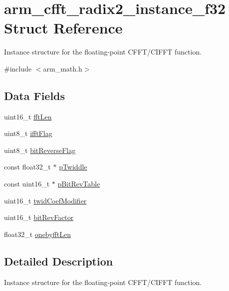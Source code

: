 \hypertarget{structarm__cfft__radix2__instance__f32}{}\section{arm\+\_\+cfft\+\_\+radix2\+\_\+instance\+\_\+f32 Struct Reference}
\label{structarm__cfft__radix2__instance__f32}


Instance structure for the floating-\/point C\+F\+F\+T/\+C\+I\+F\+FT function.  




{\ttfamily \#include $<$arm\+\_\+math.\+h$>$}

\subsection*{Data Fields}
\begin{DoxyCompactItemize}
\item 
uint16\+\_\+t \mbox{\hyperlink{structarm__cfft__radix2__instance__f32_ab8db3bbe7c61e6bb8ca2a55e3446e11a}{fft\+Len}}
\item 
uint8\+\_\+t \mbox{\hyperlink{structarm__cfft__radix2__instance__f32_ad6ca6e223f986ebfd94c5ee1e410aa73}{ifft\+Flag}}
\item 
uint8\+\_\+t \mbox{\hyperlink{structarm__cfft__radix2__instance__f32_a09a221a818c6d0e064557a99e2fe9a8b}{bit\+Reverse\+Flag}}
\item 
const float32\+\_\+t $\ast$ \mbox{\hyperlink{structarm__cfft__radix2__instance__f32_a8292d9775f5c5472f59915649fe3b378}{p\+Twiddle}}
\item 
const uint16\+\_\+t $\ast$ \mbox{\hyperlink{structarm__cfft__radix2__instance__f32_a3b229432d381b0a511a9cdbe3aa74e78}{p\+Bit\+Rev\+Table}}
\item 
uint16\+\_\+t \mbox{\hyperlink{structarm__cfft__radix2__instance__f32_afe772e5b5001c9d8e85032115a8df5bf}{twid\+Coef\+Modifier}}
\item 
uint16\+\_\+t \mbox{\hyperlink{structarm__cfft__radix2__instance__f32_a33386d95319dc3ee7097b3a8e52e01ec}{bit\+Rev\+Factor}}
\item 
float32\+\_\+t \mbox{\hyperlink{structarm__cfft__radix2__instance__f32_acf295a7b97b7d48a9cae4d1ab5ed00f6}{onebyfft\+Len}}
\end{DoxyCompactItemize}


\subsection{Detailed Description}
Instance structure for the floating-\/point C\+F\+F\+T/\+C\+I\+F\+FT function. 

